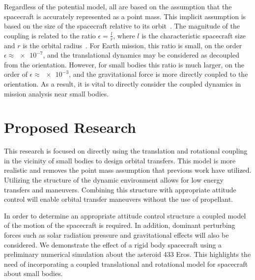\documentclass[11pt,draft]{article} %
\begin{document}
Regardless of the potential model, all are based on the assumption that the spacecraft is accurately represented as a point mass.
This implicit assumption is based on the size of the spacecraft relative to its orbit~\cite{hughes2004}.
The magnitude of the coupling is related to the ratio \( \epsilon = \frac{l}{r} \), where \( l \) is the characteristic spacecraft size and \( r \) is the orbital radius~\cite{sincarsin1983}. 
For Earth mission, this ratio is small, on the order \( \epsilon \approx \num{e-7}\), and the translational dynamics may be considered as decoupled from the orientation.
However, for small bodies this ratio is much larger, on the order of \( \epsilon \approx \num{e-3}\), and the gravitational force is more directly coupled to the orientation.
As a result, it is vital to directly consider the coupled dynamics in mission analysis near small bodies.

\section{Proposed Research}
This research is focused on directly using the translation and rotational coupling in the vicinity of small bodies to design orbital transfers.
This model is more realistic and removes the point mass assumption that previous work have utilized. 
Utilizing the structure of the dynamic environment allows for low energy transfers and maneuvers.
Combining this structure with appropriate attitude control will enable orbital transfer maneuvers without the use of propellant.

In order to determine an appropriate attitude control structure a coupled model of the motion of the spacecraft is required.
In addition, dominant perturbing forces such as solar radiation pressure and gravitational effects will also be considered. 
We demonstrate the effect of a rigid body spacecraft using a preliminary numerical simulation about the asteroid 433 Eros.
This highlights the need of incorporating a coupled translational and rotational model for spacecraft about small bodies.
\end{document}

